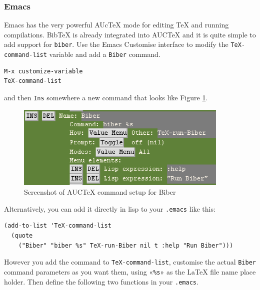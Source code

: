 \documentclass{ltxdockit}
\begin{document}
\subsubsection{Emacs}

Emacs has the very powerful AUcTeX mode for editing TeX and running
compilations. BibTeX is already integrated into AUCTeX and it is quite
simple to add support for \verb+biber+. Use the Emacs Customise interface to
modify the \verb+TeX-command-list+ variable and add a \verb+Biber+ command.

\begin{verbatim}
M-x customize-variable
TeX-command-list
\end{verbatim}

\noindent and then \verb+Ins+ somewhere a new command that looks like
Figure \ref{fig:biber-auctex}.

\begin{figure}[!htbp]
  \centering
  \includegraphics[width=4in,keepaspectratio=true]{biber-auctex.png}
  \caption{Screenshot of AUCTeX command setup for Biber}
  \label{fig:biber-auctex}
\end{figure}

\noindent Alternatively, you can add it directly in lisp to your \verb+.emacs+ like
this:

\begin{verbatim}
(add-to-list 'TeX-command-list
  (quote
    ("Biber" "biber %s" TeX-run-Biber nil t :help "Run Biber")))
\end{verbatim}

\noindent However you add the command to \verb+TeX-command-list+, customise the
actual \verb+Biber+ command parameters as you want them, using «\verb+%s+» as
the LaTeX file name place holder. Then define the following two functions
in your \verb+.emacs+.
\end{document}
